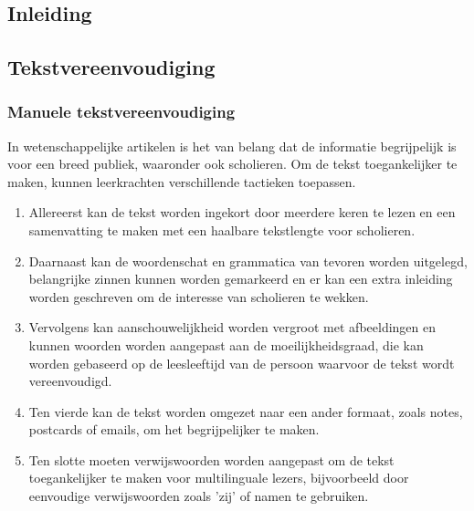 \chapter{}%
\label{ch:stand-van-zaken}



\section{Inleiding}


\section{Tekstvereenvoudiging}

\subsection{Manuele tekstvereenvoudiging}


In wetenschappelijke artikelen is het van belang dat de informatie begrijpelijk is voor een breed publiek, waaronder ook scholieren. Om de tekst toegankelijker te maken, kunnen leerkrachten verschillende tactieken toepassen. 

\begin{enumerate}
	\item Allereerst kan de tekst worden ingekort door meerdere keren te lezen en een samenvatting te maken met een haalbare tekstlengte voor scholieren.
	\item Daarnaast kan de woordenschat en grammatica van tevoren worden uitgelegd, belangrijke zinnen kunnen worden gemarkeerd en er kan een extra inleiding worden geschreven om de interesse van scholieren te wekken.
	\item Vervolgens kan aanschouwelijkheid worden vergroot met afbeeldingen en kunnen woorden worden aangepast aan de moeilijkheidsgraad, die kan worden gebaseerd op de leesleeftijd van de persoon waarvoor de tekst wordt vereenvoudigd.
	\item Ten vierde kan de tekst worden omgezet naar een ander formaat, zoals notes, postcards of emails, om het begrijpelijker te maken. 
	\item Ten slotte moeten verwijswoorden worden aangepast om de tekst toegankelijker te maken voor multilinguale lezers, bijvoorbeeld door eenvoudige verwijswoorden zoals 'zij' of namen te gebruiken.
\end{enumerate}    

